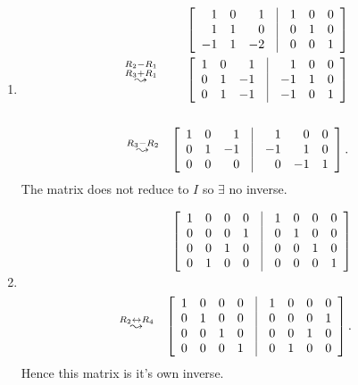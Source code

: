 \documentclass[12pt]{article}
\begin{document}
\begin{enumerate}
\begin{enumerate}
\item
\begin{eqnarray*}&&
\left[ \begin{array}{rrrcrrr} 1 & 0 & 1 & \vline & 1 & 0 & 0\\
                               1 & 1 & 0 & \vline & 0 & 1 & 0\\
                               -1 & 1 & -2 & \vline & 0 & 0 & 1
\end{array} \right]\\
 \overset{\begin{smallmatrix}R_2-R_1\\R_3+R_1\end{smallmatrix}}{\leadsto}
&&\vspace{-10mm}\left[ \begin{array}{rrrcrrr} 1 & 0 & 1 & \vline & 1 & 0 & 0\\
                              0 & 1 & -1 & \vline & -1 & 1 & 0\\
                              0 & 1 & -1 & \vline & -1 & 0 & 1
\end{array} \right]\\ \\
\overset{R_3-R_2}{\leadsto}
&&\vspace{-10mm}\left[ \begin{array}{rrrcrrr} 1 & 0 & 1 & \vline & 1 & 0 & 0\\
                               0 & 1 & -1 & \vline & -1 & 1 & 0\\
                               0 & 0 & 0 & \vline & 0 & -1 & 1
\end{array} \right].
\end{eqnarray*}
The matrix does not reduce to $I$ so $\exists$ no inverse.
\item
\begin{eqnarray*}
&&
\left[ \begin{array}{rrrrcrrrr}  1 & 0 & 0 & 0 & \vline & 1 & 0 & 0 & 0\\
                                 0 & 0 & 0 & 1 & \vline & 0 & 1 & 0 & 0\\
                                 0 & 0 & 1 & 0 & \vline & 0 & 0 & 1 & 0\\
                                 0 & 1 & 0 & 0 & \vline & 0 & 0 & 0 & 1
\end{array} \right] \\ \\\overset{R_2\leftrightarrow R_4}{\leadsto}
&&\vspace{-10mm}\left[ \begin{array}{rrrrcrrrr}  1 & 0 & 0 & 0 & \vline & 1 & 0 & 0 & 0\\
                                 0 & 1 & 0 & 0 & \vline & 0 & 0 & 0 & 1\\
                                 0 & 0 & 1 & 0 & \vline & 0 & 0 & 1 & 0\\
                                 0 & 0 & 0 & 1 & \vline & 0 & 1 & 0 & 0
\end{array} \right].
\end{eqnarray*}
 Hence this matrix is it's own inverse.


\end{enumerate}
\end{enumerate}
\end{document}
